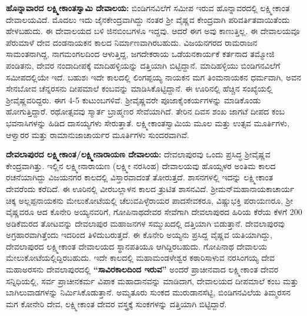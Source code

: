 \textbf{ಹೊನ್ನಾವಾರದ ಲಕ್ಷ್ಮೀಕಾಂತಸ್ವಾಮಿ ದೇವಾಲಯ:} ಬಿಂಡಿಗನವಿಲೆಗೆ ಸಮೀಪ ಇರುವ ಹೊನ್ನಾವರದಲ್ಲಿ ಲಕ್ಷ್ಮೀಕಾಂತ ದೇವಾಲಯವಿದೆ. ಮೊದಲು ಇದು ಜೈನಕೇಂದ್ರವಾಗಿದ್ದು ನಂತರ ಶ‍್ರೀ ವೈಷ್ಣವ ಕೇಂದ್ರವಾಗಿ ಪರಿವರ್ತಿತವಾಯಿತೆಂದು ಹೇಳಬಹುದು. ಈ ದೇವಾಲಯದ ಬಳಿ ಜಿನಬಿಂಬಗಳೂ ಇದ್ದವು. ಆದರೆ ಈಗ ಅವು ಕಾಣುತ್ತಿಲ್ಲ. ಈ ದೇವಾಲಯವೂ ಪೆರುಮಾಳೆ ದೇವ ದಂಡನಾಯಕನ ಕಾಲದ ನಿರ್ಮಾಣವಾಗಿರಬಹುದು. ವಿಜಯನಗರದ ರಾಮರಾಜನ ಸಾಮಂತನಾಗಿದ್ದ, ನಾಗಮಂಗಲದಿಂದ ಆಳುತ್ತಿದ್ದ, ಜಗದೇಕರಾಯ ಒಡೆಯನಕಾರ್ಯಕೆ ಕರ್ತನಾದ ತಮ್ಮೋಜಿ ಪಂಡಿತನು, ದೇವರ ನಂದಾದೀಪಕ್ಕೆ ಮಾದಿಹಳ್ಳಿಯನ್ನು ದತ್ತಿಯಾಗಿ ಬಿಟ್ಟಿದ್ದಾನೆ. ಮಾದಿಹಳ್ಳಿಯು ಬಿಂಡಿಗನವಿಲೆಗೆ ಸಮೀಪದಲ್ಲಿಯೇ ಇದೆ. ಬಹುಶಃ ಇದೇ ಕಾಲದಲ್ಲಿ ಲಿಂಗಪ್ಪಯ್ಯ ನಾಯಕನ ಮಗ ತಿಂಮನಾಯಕನ ಧರ್ಮವಾಗಿ, ಅವನ ಸೇನಬೋವ ಚೆನ್ನರಸನು ದೀಪಮಾಲೆ ಕಂಬವನ್ನು ಮಾಡಿಸಿಕೊಟ್ಟಿದ್ದಾನೆ. ಈ ಊರಿನಲ್ಲಿ ಹೆಚ್ಚಿನ ಸಂಖ್ಯೆಯಲ್ಲಿ ಶ‍್ರೀವೈಷ್ಣವರಿದ್ದರು. ಈಗ 4-5 ಕುಟುಂಬಗಳಿವೆ. ಶ‍್ರೀವೈಷ್ಣವರೇ ಪೂಜಾಕೈಂಕರ್ಯಗಳನ್ನು ಮಾಡಿಕೊಂಡು ಹೋಗುತ್ತಿದ್ದಾರೆ. ರಥೋತ್ಸವವು ಸ್ಮಾರ್ತ ಬ್ರಾಹ್ಮಣರ ಸೇವೆಯಾಗಿದೆ. ತೇರಿನ ದಿವಸ ಶಂಖ ಜಾಗಟೆ ದೀಪದ ಕಂಬ ಭವನಾಸಿಗಳನ್ನು ಹಿಡಿದ ದಾಸಯ್ಯಗಳು ಸೇರುತ್ತಾತೆ. ಲಕ್ಷ್ಮೀಕಾಂತಸ್ವಾಮಿಯ ಮೂಲ ಮತ್ತು ಉತ್ಸವ ಮೂರ್ತಿಗಳು, ಆಳ್ವಾರರ ಮತ್ತು ರಾಮಾನುಜಾಚಾರ್ಯರ ಮೂರ್ತಿಗಳು ಸುಂದರವಾಗಿವೆ.

\textbf{ದೇವಲಾಪುರದ ಲಕ್ಷ್ಮೀಕಾಂತ/ಲಕ್ಷ್ಮೀನಾರಾಯಣ ದೇವಾಲಯ:} ದೇವಲಾಪುರವು ಒಂದು ಪ್ರಸಿದ್ಧ ಶ‍್ರೀವೈಷ್ಣವ ಕೇಂದ್ರವಾಗಿತ್ತು. ಇಲ್ಲಿನ ಲಕ್ಷ್ಮೀನಾರಾಯಣ (ಲಕ್ಷ್ಮೀ ನರಸಿಂಹ) ದೇವಾಲಯವು ಹೊಯ್ಸಳರ ಅಂತಿಮ ಕಾಲದ ರಚನೆಯಾಗಿದ್ದು ವಿಜಯನಗರ ಕಾಲದಲ್ಲಿ ವಿಸ್ತಾರವಾದಂತೆ ತೋರುತ್ತದೆ. ಶಾಸನಗಳಲ್ಲಿ ಇದನ್ನು ಲಕ್ಷ್ಮೀಕಾಂತ ದೇವರೆಂದು ಕರೆದಿದೆ. ಈ ಊರಿನಲ್ಲಿ ವೀರಬಲ್ಲಾಳನ ಕಾಲದ ತ್ರುಟಿತ ಶಾಸನವಿದೆ. ಶ‍್ರೀಮನ್​ ಮಹಾನಾಯಕಾಚಾರ್ಯ ಚಿಕ್ಕ ಅಲ್ಲಪ್ಪನಾಯಕನು ಮೇಲುಕೋಟೆಯಲ್ಲಿ ಚೆಲುವಪಿಳ್ಳೆರಾಯರ ಪಾದಸೇವಕರೂ, ವಿಷ್ಣುಭಕ್ತಿ ಪರಾಯಣರೂ, ಶ‍್ರೀ ವೈಷ್ಣವರೂ ಆದ ಕೊನೇರಿ ಅಯ್ಯನವರಿಗೆ, ಗೋಪಿನಾಥದೇವರ ಸೇವೆಗಾಗಿ ದೇವಲಾಪುರದ ಹಿರಿಯ ಕೆರೆಯ ಕೆಳಗೆ 200 ಅಡಿಕೆಮರದ ತೋಟವನ್ನು ದೇವಲಾಪುರ ಮಹಾಜನಗಳ ಸಮ್ಮುಖದಲ್ಲಿ ದತ್ತಿಯಾಗಿ ಬಿಡುತ್ತಾನೆ. ದೇವಲಾಪುರವು ಅಗ್ರಹಾರವಾಗಿತ್ತೆಂದು ಇದರಿಂದ ತಿಳಿದುಬರುತ್ತದೆ. ಈ ಕೊನೇರಿ ಅಯ್ಯನು ಪ್ರಸಿದ್ದ ವೈಷ್ಣವ ಯತಿಯಾಗಿದ್ದು, ದೇವಲಾಪುರದ ಲಕ್ಷ್ಮೀಕಾಂತ ದೇವಾಲಯದ ಸ್ಥಾನಪತಿಯೂ ಆಗಿದ್ದಿರಬಹುದು. ಗೋಪಿನಾಥ ದೇವಾಲಯ ಮೇಲುಕೋಟೆಯಲ್ಲಿದ್ದಿರಬಹುದು. ಇದೇ ಕಾಲದಲ್ಲಿ ಮಹಾಮಂಡಳೇಶ್ವರ ಕಠಾರಿಸಾಳುವ ನರಸಿಂಗಯ್ಯ ದೇವ ಮಹಾಅರಸನು ದೇವಲಾಪುರದಲ್ಲಿ \textbf{“ಸಾವಿರಕಾಲದಿಂದ ಇರುವ”} ಅಂದರೆ ಪ್ರಾಚೀನವಾದ ಲಕ್ಷ್ಮೀಕಾಂತ ದೇವರ ಸನ್ನಿಧಿಯಲ್ಲಿ, ಸರ್ವ ಪ್ರಾಚೀನಕರ್ಮ ವಿಪಾಕ ಮಹಾದಾನವನ್ನು ಮಾಡಿದಾಗ, ದೇವಾಲಯದ ದೀಪಮಾಲೆ ಕಂಬ ಮತ್ತು ಬಾಗಿಲುವಾಡಗಳನ್ನು ನಿರ್ಮಿಸಿಕೊಡುತ್ತಾನೆ. ಅಮೃತೂರು ಸುಂಕದ ಮುರುಡಾನಸೆಟ್ಟಿ, ಬಿಂಡಿಗನವಿಲೆಯ ತಿಮ್ಮರಸನ ಮಗ ಕೋನೇರಿ ದೇವ, ಲಕ್ಷ್ಮೀಕಾಂತ ದೇವರ ವಸ್ತ್ರಕ್ಕೆ ಸುಂಕಗಳನ್ನು ದತ್ತಿಯಾಗಿ ಬಿಟ್ಟಿದ್ದಾರೆ.

